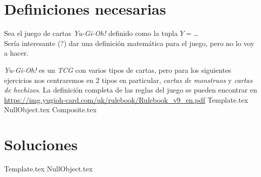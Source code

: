 \section{Definiciones necesarias}
  Sea el juego de cartas \textit{Yu-Gi-Oh!} definido como la tupla 
  $Y = $\dots\\
  Sería interesante (?) dar una definición matemática para el juego, pero no lo voy a 
  hacer.

  \textit{Yu-Gi-Oh!} es un \textit{TCG} con varios tipos de cartas, pero para los 
  siguientes ejercicios nos centraremos en 2 tipos en particular, \textit{cartas de 
  monstruos} y \textit{cartas de hechizos}.
  La definición completa de las reglas del juego se pueden encontrar en 
  \url{https://img.yugioh-card.com/uk/rulebook/Rulebook_v9_en.pdf}
%
{Template.tex} 
{NullObject.tex}
{Composite.tex}

\pagebreak
\section{Soluciones}
  {Template.tex}
  {NullObject.tex}
%